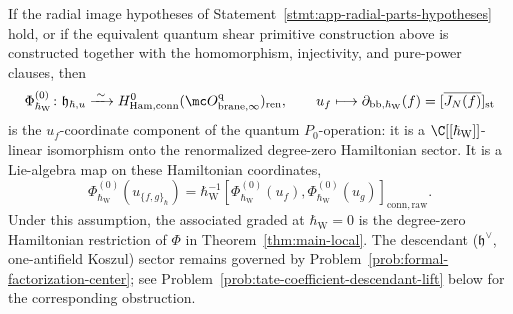 \documentclass[11pt]{memoir}
\begin{document}
\begin{thm}
  If the radial image hypotheses of
  Statement~\ref{stmt:app-radial-parts-hypotheses} hold, or if the
  equivalent quantum shear primitive construction above is constructed
  together with the homomorphism, injectivity, and pure-power clauses,
  then
  $$\Phi_{\hbar_{\mathrm{W}}}^{(0)}\colon\mathfrak h_{\hbar,u}
      \xrightarrow{\;\sim\;}
      H^0_{\mathrm{Ham,conn}}
        (\mc O^{\mathrm q}_{\mathrm{brane},\infty})_{\mathrm{ren}},
      \qquad
      u_f\longmapsto\partial_{\mathrm{bb},\hbar_{\mathrm{W}}}(f)
       =[\overline{J_N(f)}]_{\mathrm{st}}$$
  is the \(u_f\)-coordinate component of the quantum
  \(P_0\)-operation: it is a \(\C[[\hbar_{\mathrm{W}}]]\)-linear isomorphism onto the
  renormalized degree-zero Hamiltonian sector.  It is a Lie-algebra map on
  these Hamiltonian coordinates,
  $$\Phi_{\hbar_{\mathrm{W}}}^{(0)}(u_{\{f,g\}_\hbar})
    =\hbar_{\mathrm{W}}^{-1}[\Phi_{\hbar_{\mathrm{W}}}^{(0)}(u_f),
      \Phi_{\hbar_{\mathrm{W}}}^{(0)}(u_g)]_{\mathrm{conn,raw}}.$$
  Under this assumption, the associated graded at \(\hbar_{\mathrm{W}}=0\) is the degree-zero Hamiltonian
  restriction of $\Phi$ in Theorem~\ref{thm:main-local}. The descendant
  ($\mathfrak h^\vee$, one-antifield Koszul) sector remains governed by
  Problem~\ref{prob:formal-factorization-center}; see
  Problem~\ref{prob:tate-coefficient-descendant-lift} below for the corresponding
  obstruction.
\end{thm}
\end{document}
